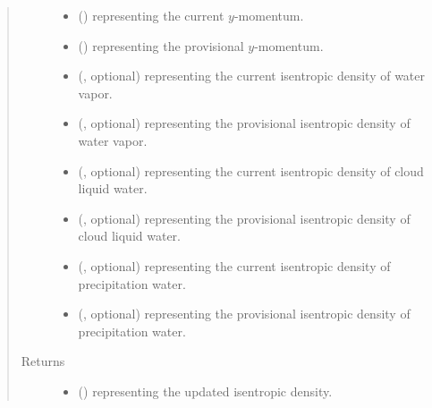\documentclass[letterpaper,10pt,english]{sphinxmanual}
\begin{document}
\begin{fulllineitems}
\begin{fulllineitems}
\begin{quote}
\begin{description}
\begin{itemize}
\item {} 
 () \textendash{}  representing the current \(y\)-momentum.

\item {} 
 () \textendash{}  representing the provisional \(y\)-momentum.

\item {} 
 (, optional) \textendash{}  representing the current isentropic density of water vapor.

\item {} 
 (, optional) \textendash{}  representing the provisional isentropic density of water vapor.

\item {} 
 (, optional) \textendash{}  representing the current isentropic density of cloud liquid water.

\item {} 
 (, optional) \textendash{}  representing the provisional isentropic density of cloud liquid water.

\item {} 
 (, optional) \textendash{}  representing the current isentropic density of precipitation water.

\item {} 
 (, optional) \textendash{}  representing the provisional isentropic density of precipitation water.

\end{itemize}

\item[{Returns}] \leavevmode
\begin{itemize}
\item {} 
 () \textendash{}  representing the updated isentropic density.


\end{itemize}
\end{description}
\end{quote}
\end{fulllineitems}
\end{fulllineitems}
\end{document}
